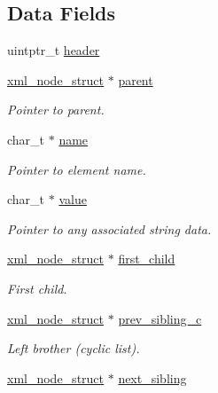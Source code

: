 \subsection*{Data Fields}
\begin{CompactItemize}
\item 
uintptr\_\-t \hyperlink{structpugi_1_1xml__node__struct_ea2e405a368dc5a278a2d23465f1975c}{header}
\item 
\hyperlink{structpugi_1_1xml__node__struct}{xml\_\-node\_\-struct} $\ast$ \hyperlink{structpugi_1_1xml__node__struct_f692c222bcc5a9f61108cb3ae0b7b5ea}{parent}
\begin{CompactList}\small\item\em Pointer to parent. \item\end{CompactList}\item 
char\_\-t $\ast$ \hyperlink{structpugi_1_1xml__node__struct_e2324fdbd1e307fb12007d1d0f957a0b}{name}
\begin{CompactList}\small\item\em Pointer to element name. \item\end{CompactList}\item 
char\_\-t $\ast$ \hyperlink{structpugi_1_1xml__node__struct_191e708864fccda17bb66157afdadd2d}{value}
\begin{CompactList}\small\item\em Pointer to any associated string data. \item\end{CompactList}\item 
\hyperlink{structpugi_1_1xml__node__struct}{xml\_\-node\_\-struct} $\ast$ \hyperlink{structpugi_1_1xml__node__struct_f72c49a0f81928ef664d9d2f0260f23d}{first\_\-child}
\begin{CompactList}\small\item\em First child. \item\end{CompactList}\item 
\hyperlink{structpugi_1_1xml__node__struct}{xml\_\-node\_\-struct} $\ast$ \hyperlink{structpugi_1_1xml__node__struct_74e62128c88c422c0ed969633bbb2d4e}{prev\_\-sibling\_\-c}
\begin{CompactList}\small\item\em Left brother (cyclic list). \item\end{CompactList}\item 
\hyperlink{structpugi_1_1xml__node__struct}{xml\_\-node\_\-struct} $\ast$ \hyperlink{structpugi_1_1xml__node__struct_cf0867e3a77871e37132046d97398a6d}{next\_\-sibling}

\end{CompactItemize}
